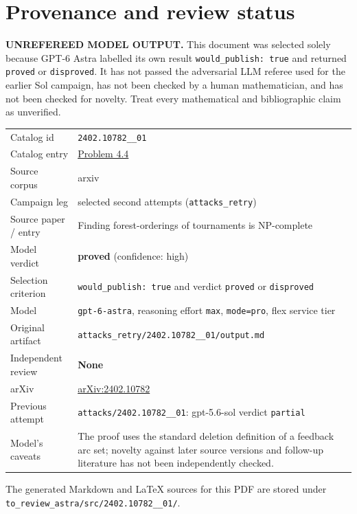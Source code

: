 \documentclass[
  11pt,
  a4paper,
]{article}
\newcounter{none} %
\begin{document}
\appendix

\section{Provenance and review
status}\label{provenance-and-review-status}

\begin{warning}

\textbf{UNREFEREED MODEL OUTPUT.} This document was selected solely
because GPT-6 Astra labelled its own result
\texttt{would\_publish:\ true} and returned \texttt{proved} or
\texttt{disproved}. It has not passed the adversarial LLM referee used
for the earlier Sol campaign, has not been checked by a human
mathematician, and has not been checked for novelty. Treat every
mathematical and bibliographic claim as unverified.

\end{warning}

{\def\LTcaptype{none} %
\begin{longtable}[]{@{}
  >{\raggedright\arraybackslash}p{}
  >{\raggedright\arraybackslash}p{}@{}}
\toprule\noalign{}
\endhead
\bottomrule\noalign{}
\endlastfoot
Catalog id & \texttt{2402.10782\_\_01} \\
Catalog entry &
\href{https://graph-theory-ai.github.io/graph-conjectures/arxiv/2402.10782__01/}{Problem
4.4} \\
Source corpus & arxiv \\
Campaign leg & selected second attempts (\texttt{attacks\_retry}) \\
Source paper / entry & Finding forest-orderings of tournaments is
NP-complete \\
Model verdict & \textbf{proved} (confidence: high) \\
Selection criterion & \texttt{would\_publish:\ true} and verdict
\texttt{proved} or \texttt{disproved} \\
Model & \texttt{gpt-6-astra}, reasoning effort \texttt{max},
\texttt{mode=pro}, flex service tier \\
Original artifact &
\texttt{attacks\_retry/2402.10782\_\_01/output.md} \\
Independent review & \textbf{None} \\
arXiv & \href{https://arxiv.org/abs/2402.10782}{arXiv:2402.10782} \\
Previous attempt & \texttt{attacks/2402.10782\_\_01}: gpt-5.6-sol
verdict \texttt{partial} \\
Model's caveats & The proof uses the standard deletion definition of a
feedback arc set; novelty against later source versions and follow-up
literature has not been independently checked. \\
\end{longtable}
}

The generated Markdown and LaTeX sources for this PDF are stored under
\texttt{to\_review\_astra/src/2402.10782\_\_01/}.
\end{document}
